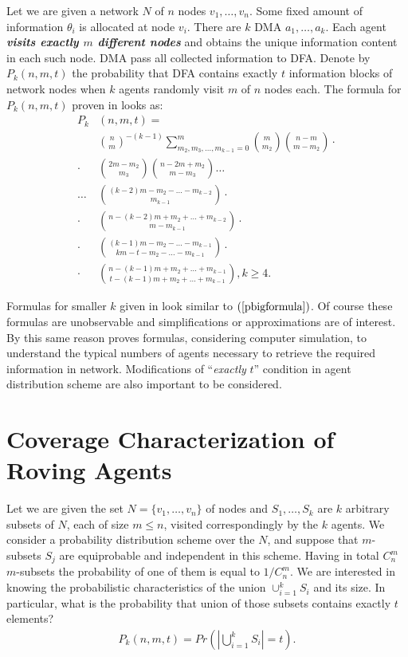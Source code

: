 \documentclass[conference]{IEEEtran}
\begin{document}
Let we are given a network $N$ of $n$ nodes $v_{1},\ldots,v_{n}$. Some fixed amount of information $\theta_{i}$ is allocated at node $v_{i}$. There are $k$ DMA  $a_{1},\ldots,a_{k}$. Each agent \textit{\textbf{visits exactly $m$ different nodes}} and obtains the unique information content in each such node. DMA pass all collected information to DFA. Denote by $P_{k}(n,m,t)$ the probability that DFA contains exactly $t$ information blocks of network nodes when $k$ agents randomly visit $m$ of $n$ nodes each. The formula for $P_{k}(n,m,t)$ proven in \cite{irarandomagents} looks as:
\begin{align}
 P_{k}  &(n,m,t)= \nonumber \\ &\binom{n}{m}^{-(k-1)}\sum_{m_{2},m_{3},\ldots,m_{k-1}=0}^{m}\binom{m}{m_{2}} \binom{n-m}{m-m_{2}} \cdot \nonumber \\
 \cdot  &\binom{2m-m_{2}}{m_{3}}\binom{n-2m+m_{2}}{m-m_{3}}\ldots \nonumber \\
 \ldots &\binom{(k-2)m-m_{2}-\ldots-m_{k-2}}{m_{k-1}} \cdot \nonumber \\
 \cdot  &\binom{n-(k-2)m+m_{2}+\ldots+m_{k-2}}{m-m_{k-1}}\cdot \nonumber \\ 
 \cdot  &\binom{(k-1)m-m_{2}-\ldots-m_{k-1}}{km-t-m_{2}-\ldots-m_{k-1}}\cdot \nonumber \\
 \cdot  &\binom{n-(k-1)m+m_{2}+\ldots+m_{k-1}}{t-(k-1)m+m_{2}+\ldots+m_{k-1}},k\geq4. \label{pbigformula}
\end{align}

Formulas for smaller $k$ given in \cite{irarandomagents} look similar to $(\ref{pbigformula})$. Of course these formulas are unobservable and simplifications or approximations are of interest. By this same reason \cite{irarandomagents} proves formulas, considering computer simulation, to understand the typical numbers of agents necessary to retrieve the required information in network. Modifications of ``\textit{exactly} $t$'' condition in agent distribution scheme are also important to be considered.

\section{Coverage Characterization of Roving Agents}
Let we are given the set $N=\{v_{1},\ldots,v_{n}\}$ of nodes and $S_{1},\ldots,S_{k}$ are $k$ arbitrary subsets of $N$, each of size $m\leq n$, visited correspondingly by the $k$ agents. We consider a probability distribution scheme over the $N$, and suppose that  $m$-subsets $S_{j}$ are equiprobable and independent in this scheme. Having in total $C_{n}^{m}$ $m$-subsets the probability of one of them is equal to $1/C_{n}^{m}$. We are interested in knowing the probabilistic characteristics of the union $\cup_{i=1}^{k}S_{i}$ and its size. In particular, what is the probability that union of those subsets contains exactly $t$ elements?
\begin{align}
P_{k}(n,m,t)=Pr\left(\left|\bigcup_{i=1}^{k}S_{i}\right|=t\right). \label{pt}
\end{align}
\end{document}

